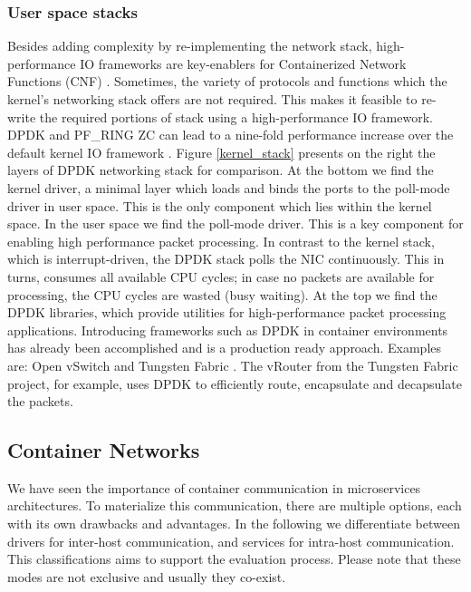 \documentclass[conference]{IEEEtran}
\begin{document}
\subsubsection{User space stacks}
Besides adding complexity by re-implementing the network stack, high-performance IO frameworks are key-enablers for Containerized Network Functions (CNF) \cite{SIGARCH_2017:Yang}. Sometimes, the variety of protocols and functions which the kernel's networking stack offers are not required. This makes it feasible to re-write the required portions of stack using a high-performance IO framework. DPDK \cite{dpdk} and PF\_RING ZC \cite{pf_ring_zc} can lead to a nine-fold performance increase over the default kernel IO framework \cite{ANCS:Gallenmüller}. Figure \ref{kernel_stack} presents on the right the layers of DPDK networking stack for comparison. At the bottom we find the kernel driver, a minimal layer which loads and binds the ports to the poll-mode driver in user space. This is the only component which lies within the kernel space. In the user space we find the poll-mode driver. This is a key component for enabling high performance packet processing. In contrast to the kernel stack, which is interrupt-driven, the DPDK stack polls the NIC continuously. This in turns, consumes all available CPU cycles; in case no packets are available for processing, the CPU cycles are wasted (busy waiting). At the top we find the DPDK libraries, which provide utilities for high-performance packet processing applications. Introducing frameworks such as DPDK in container environments has already been accomplished and is a production ready approach. Examples are: Open vSwitch \cite{ovs-dpdk} and Tungsten Fabric \cite{tungsten-dpdk}. The vRouter from the Tungsten Fabric project, for example, uses DPDK to efficiently route, encapsulate and decapsulate the packets.

\subsection{Container Networks}
We have seen the importance of container communication in microservices architectures. To materialize this communication, there are multiple options, each with its own drawbacks and advantages. In the following we differentiate between drivers for inter-host communication, and services for intra-host communication. This classifications aims to support the evaluation process. Please note that these modes are not exclusive and usually they co-exist.
\end{document}
